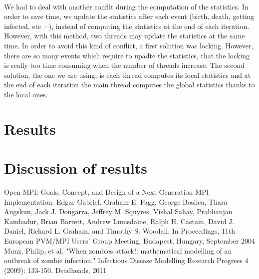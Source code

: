 \documentclass{article}
\begin{document}
\paragraph{}
We had to deal with another confilt during the computation of the statistics. In order to save time, we update the statistics after each event (birth, death, getting infected, etc $\cdots$), instead of computing the statistics at the end of each iteration. However, with this method, two threads may update the statistics at the same time. In order to avoid this kind of conflict, a first solution was locking. However, there are so many events which require to upadte the statistics, that the locking is really too time consuming when the number of threads increase. The second solution, the one we are using, is each thread computes its local statistics and at the end of each iteration the main thread computes the global statistics thanks to the local ones.



\section{Results}




\section{Discussion of results}
\begin{thebibliography}{99}
Open MPI: Goals, Concept, and Design of a Next Generation MPI Implementation. Edgar Gabriel, Graham E. Fagg, George Bosilca, Thara Angskun, Jack J. Dongarra, Jeffrey M. Squyres, Vishal Sahay, Prabhanjan Kambadur, Brian Barrett, Andrew Lumsdaine, Ralph H. Castain, David J. Daniel, Richard L. Graham, and Timothy S. Woodall. In Proceedings, 11th European PVM/MPI Users' Group Meeting, Budapest, Hungary, September 2004
Munz, Philip, et al. "When zombies attack!: mathematical modelling of an outbreak of zombie infection." Infectious Disease Modelling Research Progress 4 (2009): 133-150.
Deadheads, 2011
\end{thebibliography}
\end{document}
